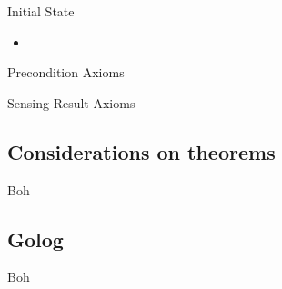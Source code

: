 \begin{frame}[fragile]{Initial State}
    \begin{itemize}
        \item 
    \end{itemize}
\end{frame}

\begin{frame}{Precondition Axioms}
    
\end{frame}

\begin{frame}{Sensing Result Axioms}
    
\end{frame}

\subsection{Considerations on theorems}

\begin{frame}{Boh}
    
\end{frame}

\subsection{Golog}

\begin{frame}{Boh}
    
\end{frame}
